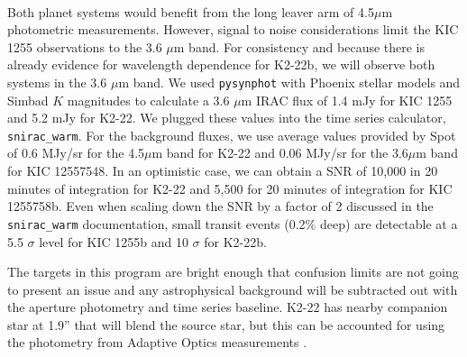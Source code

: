 \documentclass[letterpaper,12pt]{article}
\begin{document}
\\
Both planet systems would benefit from the long leaver arm of 4.5$\mu$m photometric measurements. However, signal to noise considerations limit the KIC 1255 observations to the 3.6 $\mu$m band.
For consistency and because there is already evidence for wavelength dependence for K2-22b, we will observe both systems in the 3.6 $\mu$m band.
We used \texttt{pysynphot} with Phoenix stellar models and Simbad $K$ magnitudes to calculate a 3.6 $\mu$m IRAC flux of 1.4 mJy for KIC 1255 and 5.2 mJy for K2-22.
We plugged these values into the time series calculator, \texttt{snirac\_warm}.
For the background fluxes, we use average values provided by Spot of 0.6 MJy/sr for the 4.5$\mu$m band for K2-22 and 0.06 MJy/sr for the 3.6$\mu$m band for KIC 12557548.
In an optimistic case, we can obtain a SNR of 10,000 in 20 minutes of integration for K2-22 and 5,500 for 20 minutes of integration for KIC 1255758b.
Even when scaling down the SNR by a factor of 2 discussed in the \texttt{snirac\_warm} documentation, small transit events (0.2\% deep) are detectable at a 5.5 $\sigma$ level for KIC 1255b and 10 $\sigma$ for K2-22b.

The targets in this program are bright enough that confusion limits are not going to present an issue and any astrophysical background will be subtracted out with the aperture photometry and time series baseline. K2-22 has nearby companion star at 1.9'' that will blend the source star, but this can be accounted for using the photometry from Adaptive Optics measurements \citep{sanchis-ojedak2-22}.\newline
\end{document}

